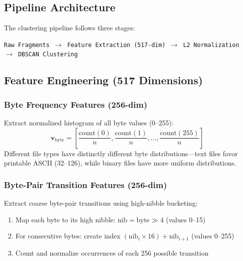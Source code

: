 \documentclass[12pt,a4paper]{report}
\begin{document}
\newpage
\chapter{}
\begin{normalsize}
\noindent

\section{Pipeline Architecture}
{\setlength{\baselineskip}{1.0\baselineskip}
The clustering pipeline follows three stages:
\begin{center}
\texttt{Raw Fragments $\rightarrow$ Feature Extraction (517-dim) $\rightarrow$ L2 Normalization $\rightarrow$ DBSCAN Clustering}
\end{center}
\par}

\section{Feature Engineering (517 Dimensions)}
{\setlength{\baselineskip}{1.0\baselineskip}

\subsection{Byte Frequency Features (256-dim)}
Extract normalized histogram of all byte values (0--255):
\begin{equation}
    \mathbf{v}_{\text{byte}} = \left[\frac{\text{count}(0)}{n}, \frac{\text{count}(1)}{n}, \ldots, \frac{\text{count}(255)}{n}\right]
\end{equation}
Different file types have distinctly different byte distributions---text files favor printable ASCII (32--126), while binary files have more uniform distributions.

\subsection{Byte-Pair Transition Features (256-dim)}
Extract coarse byte-pair transitions using high-nibble bucketing:
\begin{enumerate}[noitemsep]
    \item Map each byte to its high nibble: $\text{nib} = \text{byte} \gg 4$ (values 0--15)
    \item For consecutive bytes: create index $(\text{nib}_i \times 16) + \text{nib}_{i+1}$ (values 0--255)
    \item Count and normalize occurrences of each 256 possible transition
\end{enumerate}

}
\end{normalsize}
\end{document}
